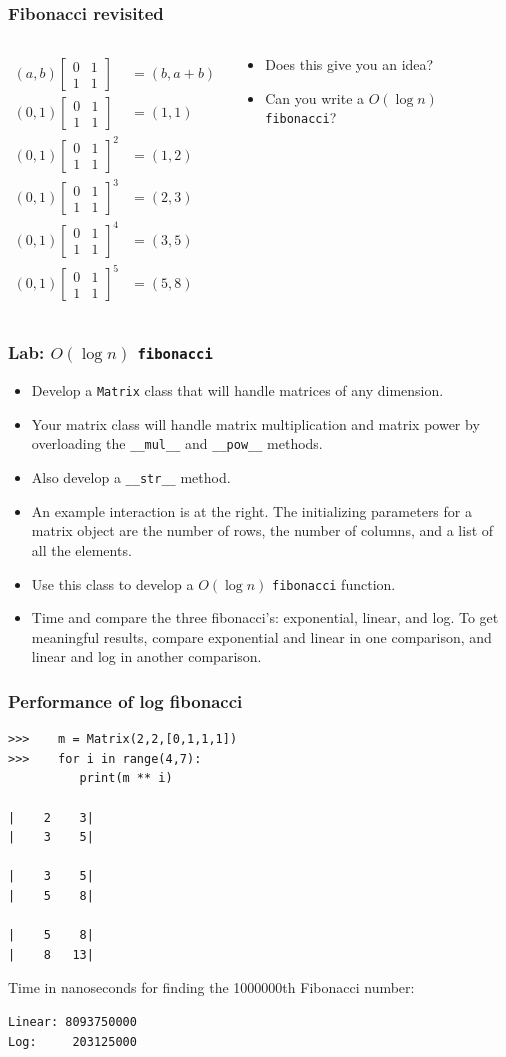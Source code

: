 \documentclass{beamer}
\newcommand{\bi}{\begin{itemize}}
\newcommand{\li}{\item}
\newcommand{\ei}{\end{itemize}}
\newcommand{\bfr}[1]{\begin{frame}[fragile]\frametitle{{ #1 }}}
\newcommand{\cola}{\begin{columns}\begin{column}{0.5\textwidth}}
\newcommand{\colb}{\end{column}\begin{column}{0.5\textwidth}}
\newcommand{\colc}{\end{column}\end{columns}}
\begin{document}
\bfr{Fibonacci revisited}
\cola
\begin{align*}
(a,b) 
\left[\begin{array}{cc} 0 & 1 \\ 1 & 1\end{array}\right]
  &= (b, a+b)
  \\
(0,1)
\left[\begin{array}{cc} 0 & 1 \\ 1 & 1\end{array}\right]
  &= (1,1)
  \\
(0,1)
\left[\begin{array}{cc} 0 & 1 \\ 1 & 1\end{array}\right]^2
  &= (1,2)
  \\
(0,1)
\left[\begin{array}{cc} 0 & 1 \\ 1 & 1\end{array}\right]^3
  &= (2,3)
  \\
(0,1)
\left[\begin{array}{cc} 0 & 1 \\ 1 & 1\end{array}\right]^4
  &= (3,5)
  \\
(0,1)
\left[\begin{array}{cc} 0 & 1 \\ 1 & 1\end{array}\right]^5
  &= (5,8)
\end{align*}
\colb
\pause
\bi
\li Does this give you an idea?
\pause
\li Can you write a $O(\log n)$ {\tt fibonacci}?
\ei
\colc


\end{frame}

\bfr{Lab:  $O(\log n)$ {\tt fibonacci}}
\bi
\li Develop a {\tt Matrix} class that will
handle matrices of any dimension.
\li Your matrix class will handle matrix multiplication
and matrix power by overloading the \lstinline{__mul__}
and \lstinline{__pow__} methods.
\li Also develop a \lstinline{__str__} method.
\li An example interaction is at the right.
The initializing parameters for a matrix object are
the number of rows, the number of columns, and a list
of all the elements.
\li Use this class to develop a $O(\log n)$
{\tt fibonacci} function.
\li Time and compare the three fibonacci's: exponential, linear,
and log.  To get meaningful results, compare exponential and linear
in one comparison, and linear and log in another comparison.
\ei
\end{frame}
\bfr{Performance of log fibonacci}
\begin{Verbatim}[frame=single]
>>>    m = Matrix(2,2,[0,1,1,1])
>>>    for i in range(4,7):
          print(m ** i)

|    2    3|
|    3    5|

|    3    5|
|    5    8|

|    5    8|
|    8   13|
\end{Verbatim}
Time in nanoseconds for finding the 1000000th Fibonacci number:
\begin{lstlisting}
Linear: 8093750000
Log:     203125000
\end{lstlisting}
\end{frame}
\end{document}
